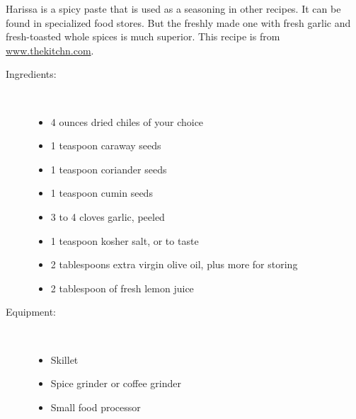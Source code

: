 \documentclass[11pt,letterpaper]{article}
\begin{document}


Harissa is a spicy paste that is used as a seasoning in other recipes. It can be found in specialized food stores. But the freshly made one with fresh garlic and fresh-toasted whole spices is much superior. This recipe is from \href{https://www.thekitchn.com/how-to-make-harissa-cooking-lessons-from-the-kitchn-190188}{www.thekitchn.com}.
\begin{description}

\item[Ingredients:]\ \\
	\begin{itemize}
	\item 4 ounces dried chiles of your choice
	\item 1 teaspoon caraway seeds
	\item 1 teaspoon coriander seeds
	\item 1 teaspoon cumin seeds
	\item 3 to 4 cloves garlic, peeled
	\item 1 teaspoon kosher salt, or to taste
	\item 2 tablespoons extra virgin olive oil, plus more for storing
	\item 2 tablespoon of fresh lemon juice
	\end{itemize}

\item[Equipment:]\ \\
	\begin{itemize}
	\item Skillet 
	\item Spice grinder or coffee grinder
	\item Small food processor
	\end{itemize}


\end{description}
\end{document}
